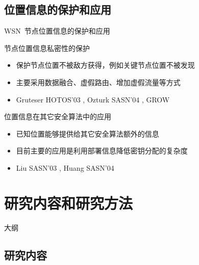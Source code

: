 \documentclass[mathserif,compress,CJKutf8, red]{beamer}
\begin{document}
\begin{CJK*}{UTF8}{song}
\subsection{位置信息的保护和应用}

\begin{frame}{WSN~节点位置信息的保护和应用}

\begin{block}{节点位置信息私密性的保护}
\begin{itemize}
\item 保护节点位置不被敌方获得，例如关键节点位置不被发现
\item 主要采用数据融合、虚假路由、增加虚假流量等方式
\item Gruteser HOTOS'03 \cite{Gruteser2003}, Ozturk SASN'04 \cite{Ozturk2004}, GROW \cite{Xi2006}
\end{itemize}
\end{block}

\bigskip

\begin{block}{位置信息在其它安全算法中的应用}
\begin{itemize}
\item 已知位置能够提供给其它安全算法额外的信息
\item 目前主要的应用是利用部署信息降低密钥分配的复杂度
\item Liu SASN'03 \cite{Liu2003}, Huang SASN'04 \cite{Huang2004}
\end{itemize}
\end{block}
\end{frame}

\section{研究内容和研究方法}

\begin{frame}{大纲}
	\tableofcontents[currentsection]
\end{frame}

\subsection{研究内容}


\end{CJK*}
\end{document}
